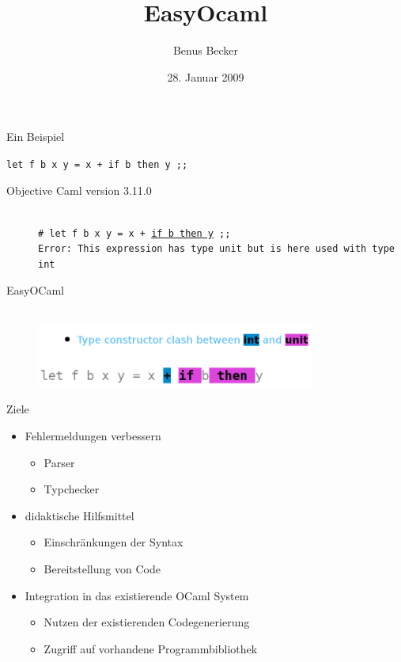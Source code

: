 \documentclass{beamer}
\author{Benus Becker}
\title[EasyOcaml]{EasyOcaml}
\subtitle{}
\date{28. Januar 2009}
\institute{Universität Freiburg \\ Institut für Informatik \\ Abtg.\ für Programmiersprachen}
\begin{document}
\frame{\titlepage}

\begin{frame}[fragile]{Ein Beispiel}
  \centerline{\tt let f b x y = x + if b then y ;;}
  \begin{description}
    \item[Objective Caml version 3.11.0]\ \\
      \texttt{\# let f b x y = x + \underline{if b then y} ;;\\
      Error: This expression has type unit but is here used with type int}
    \item[EasyOCaml]\ \\
      \includegraphics[rotate=90,width=0.75\textwidth]{mightadd}
  \end{description}
\end{frame}

\begin{frame}{Ziele}
  \begin{itemize}
    \item Fehlermeldungen verbessern
      \begin{itemize}
        \item Parser
        \item Typchecker
      \end{itemize}
    \item didaktische Hilfsmittel
      \begin{itemize}
        \item Einschränkungen der Syntax
        \item Bereitstellung von Code
      \end{itemize}
    \item Integration in das existierende OCaml System
      \begin{itemize}
        \item Nutzen der existierenden Codegenerierung
        \item Zugriff auf vorhandene Programmbibliothek
      \end{itemize}
  \end{itemize}
\end{frame}
\end{document}
